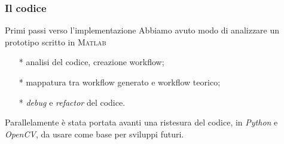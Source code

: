 \begin{frame}
\frametitle{Il codice}
\begin{block}{Primi passi verso l'implementazione}
Abbiamo avuto modo di analizzare un prototipo scritto in \textsc{Matlab}
\end{block}

\begin{block}{}
\begin{itemize}
\item[*] analisi del codice, creazione workflow;
\item[*] mappatura tra workflow generato e workflow teorico;
\item[*] \textit{debug} e \textit{refactor} del codice.
\end{itemize}
\end{block}

\begin{block}{}
Parallelamente \`e stata portata avanti una ristesura del codice, in \emph{Python}
e \emph{OpenCV}, da usare come base per sviluppi futuri.
\end{block}
\end{frame}
